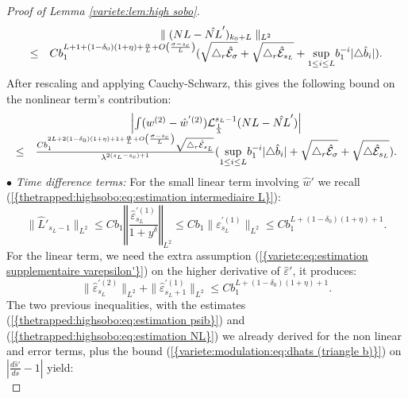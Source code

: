 \documentclass[11pt,a4paper,reqno]{amsart}
\theoremstyle{remark}
\numberwithin{equation}{section}
\begin{document}
\begin{proof}[Proof of Lemma \ref{variete:lem:high sobo}]
\begin{equation} \label{variete:highsobo:eq:estimation NL 4}
\begin{array}{r c l}
&\parallel (NL-\hat{NL}')_{k_0+L} \parallel_{L^2}\\
\leq & Cb_1^{L+1+(1-\delta_0)(1+\eta)+\frac{\alpha}{L}+O\left(\frac{\sigma-s_c}{L}  \right)}(\sqrt{\triangle_r \hat{\mathcal{E}}_{\sigma}}+\sqrt{\triangle_r \hat{\mathcal{E}}_{s_L}}+\underset{1\leq i \leq L}{\text{sup}}b_1^{-i}|\triangle \hat{b}_i|).
\end{array}
\end{equation}
After rescaling and applying Cauchy-Schwarz, this gives the following bound on the nonlinear term's contribution:
\begin{equation} \label{variete:highsobo:eq:estimation NL}
\begin{array}{r c l}
& \left| \int (w^{(2)}-\hat{w}^{'(2)})\mathcal{L}^{s_L-1}_{\frac{1}{\lambda}}(NL-\hat{NL}')\right|\\
\leq & \frac{Cb_1^{2L+2(1-\delta_0)(1+\eta)+1+\frac{\alpha}{L}+O\left(\frac{\sigma-s_c}{L} \right)}\sqrt{\triangle_r \hat{\mathcal{E}}_{s_L}}}{\lambda^{2(s_L-s_c)+1}}(\underset{1\leq i \leq L}{\text{sup}}b_1^{-i}|\triangle \hat{b}_i|+\sqrt{\triangle_r \hat{\mathcal{E}}_{\sigma}}+\sqrt{\triangle \hat{\mathcal{E}}_{s_L}}).
\end{array}
\end{equation}
$\bullet$ \emph{Time difference terms:} For the small linear term involving $\hat{w}'$ we recall {{\rm (\ref{{thetrapped:highsobo:eq:estimation intermediaire L}})}}:
$$
\parallel \hat{L}'_{s_L-1} \parallel_{L^2} \leq Cb_1 \left\Vert \frac{\hat{\varepsilon}^{'(1)}_{s_L}}{1+y^{\delta}}\right\Vert_{L^2}\leq Cb_1 \parallel \varepsilon^{'(1)}_{s_L}\parallel_{L^2}\leq Cb_1^{L+(1-\delta_0)(1+\eta)+1} .
$$
For the linear term, we need the extra assumption {{\rm (\ref{{variete:eq:estimation supplementaire varepsilon'}})}} on the higher derivative of $\hat{\varepsilon}'$, it produces:
$$
\parallel \hat{\varepsilon}^{'(2)}_{s_L} \parallel_{L^2}+\parallel \hat{\varepsilon}^{'(1)}_{s_L+1} \parallel_{L^2} \leq Cb_1^{L+(1-\delta_0)(1+\eta)+1}.
$$
The two previous inequalities, with the estimates {{\rm (\ref{{thetrapped:highsobo:eq:estimation psib}})}} and {{\rm (\ref{{thetrapped:highsobo:eq:estimation NL}})}} we already derived for the non linear and error terms, plus the bound {{\rm (\ref{{variete:modulation:eq:dhats (triangle b)}})}} on $|\frac{d\hat{s}'}{ds}-1|$ yield:
\begin{equation} \label{variete:highsobo:eq:estimation dhats'-1 1}

\end{equation}
\end{proof}
\end{document}
